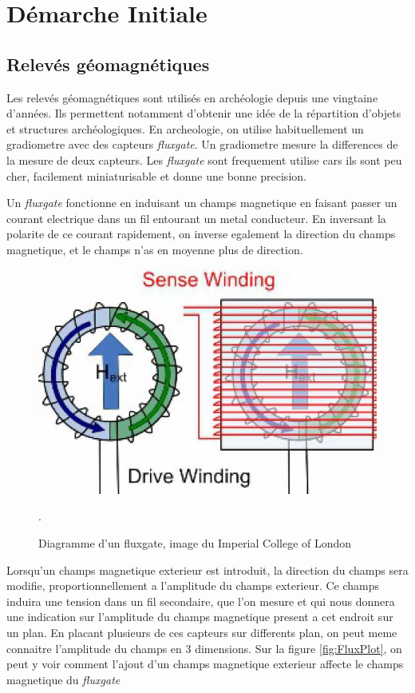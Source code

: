 \documentclass[a4paper, 12pt, titlepage, oneside, french]{article}
\begin{document}
\section{Démarche Initiale}

	\subsection{Relevés géomagnétiques}
	Les relevés géomagnétiques sont utilisés en archéologie depuis une vingtaine d'années. Ils permettent notamment d'obtenir une idée de la répartition d'objets et structures archéologiques. En archeologie, on utilise habituellement un gradiometre avec des capteurs \textit{fluxgate}. Un gradiometre mesure la differences de la mesure de deux capteurs. Les \textit{fluxgate} sont frequement utilise cars ils sont peu cher, facilement miniaturisable et donne une bonne precision.

	Un \textit{fluxgate} fonctionne en induisant un champs magnetique en faisant passer un courant electrique dans un fil entourant un metal conducteur. En inversant la polarite de ce courant rapidement, on inverse egalement la direction du champs magnetique, et le champs n'as en moyenne plus de direction.
	\begin{figure}[H]
		\centering
		\includegraphics[width=\textwidth, height=0.9\textheight, keepaspectratio]{FluxgateDiagram.jpg}
		\caption{Diagramme d'un fluxgate, image du Imperial College of London}. 
		\label{fig:FluxDiag}
	\end{figure}
	Lorsqu'un champs magnetique exterieur est introduit, la direction du champs sera modifie, proportionnellement a l'amplitude du champs exterieur. Ce champs induira une tension dans un fil secondaire, que l'on mesure et qui nous donnera une indication sur l'amplitude du champs magnetique present a cet endroit sur un plan. En placant plusieurs de ces capteurs sur differents plan, on peut meme connaitre l'amplitude du champs en 3 dimensions. Sur la figure \ref{fig:FluxPlot}, on peut y voir comment l'ajout d'un champs magnetique exterieur affecte le champs magnetique du \textit{fluxgate}
\end{document}
